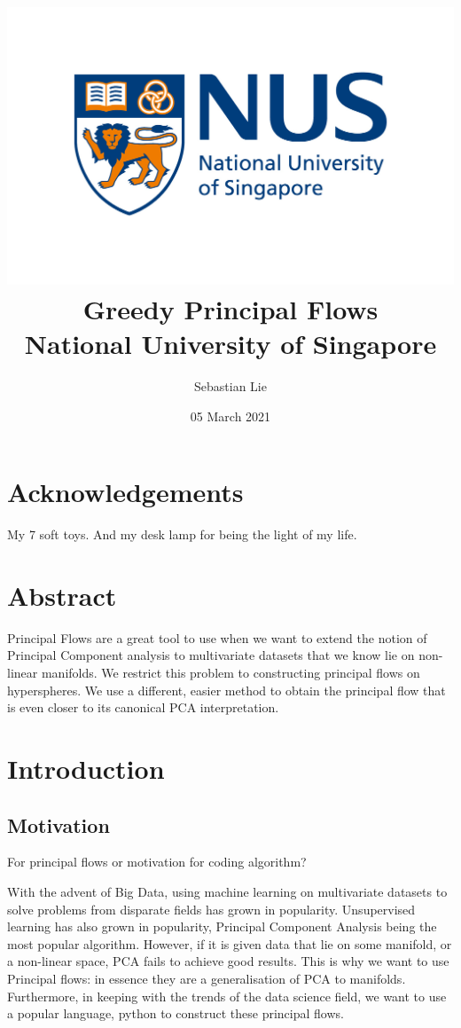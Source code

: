 \documentclass[12pt]{report}
\begin{document}
\title{
{\includegraphics[width=0.7\columnwidth]{university.jpg}}\\
{Greedy Principal Flows}\\
{\large National University of Singapore}\\
}
\author{Sebastian Lie}
\date{05 March 2021}
\maketitle

\chapter*{Acknowledgements}
My 7 soft toys. And my desk lamp for being the light of my life.

\chapter*{Abstract}
Principal Flows are a great tool to use when we want to extend the notion of Principal Component analysis to multivariate datasets that we know lie on non-linear manifolds. We restrict this problem to constructing principal flows on hyperspheres. We use a different, easier method to obtain the principal flow that is even closer to its canonical PCA interpretation. 

\newpage
\tableofcontents
\newpage

\chapter*{Introduction}

\section{Motivation}

For principal flows or motivation for coding algorithm?

With the advent of Big Data, using machine learning on multivariate datasets 
to solve problems from disparate fields has grown in popularity.
Unsupervised learning has also grown in popularity, 
Principal Component Analysis being the most popular algorithm. 
However, if it is given data that lie on some manifold, or a non-linear space, 
PCA fails to achieve good results. 
This is why we want to use Principal flows: 
in essence they are a generalisation of PCA to manifolds. 
Furthermore, in keeping with the trends of the data science field, 
we want to use a popular language, python to construct these principal flows.
\end{document}
